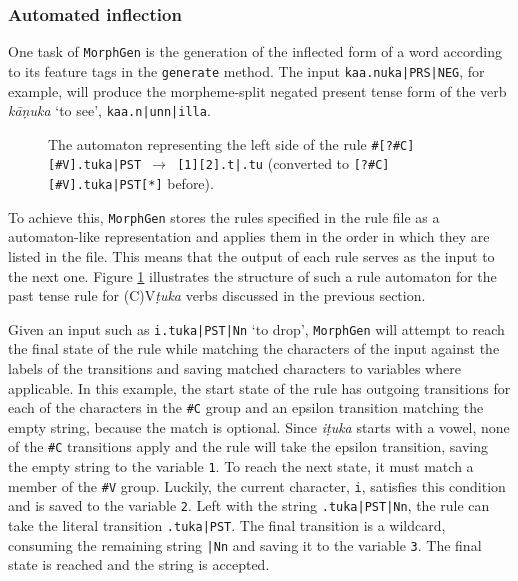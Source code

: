 \documentclass[a4paper]{article}
\newcommand{\arr}{$\rightarrow$ }
\newcommand{\typ}[1]{\texttt{#1}}
\begin{document}
\subsubsection{Automated inflection}

One task of \typ{MorphGen} is the generation of the inflected form of a word according to its feature tags in the \typ{generate} method. The input \typ{kaa.nuka|PRS|NEG}, for example, will produce the morpheme-split negated present tense form of the verb \textit{kāṇuka} `to see', \typ{kaa.n|unn|illa}.

\begin{figure}
\caption{The automaton representing the left side of the rule \typ{\#[?\#C][\#V].tuka|PST \arr [1][2].t|.tu} (converted to \typ{[?\#C][\#V].tuka|PST[*]} before).}
\label{morphrule}
\end{figure}

To achieve this, \typ{MorphGen} stores the rules specified in the rule file as a automaton-like representation and applies them in the order in which they are listed in the file. This means that the output of each rule serves as the input to the next one. Figure \ref{morphrule} illustrates the structure of such a rule automaton for the past tense rule for (C)V\textit{ṭuka} verbs discussed in the previous section.

Given an input such as \typ{i.tuka|PST|Nn} `to drop', \typ{MorphGen} will attempt to reach the final state of the rule while matching the characters of the input against the labels of the transitions and saving matched characters to variables where applicable. In this example, the start state of the rule has outgoing transitions for each of the characters in the \typ{\#C} group and an epsilon transition matching the empty string, because the match is optional. Since \textit{iṭuka} starts with a vowel, none of the \typ{\#C} transitions apply and the rule will take the epsilon transition, saving the empty string to the variable \typ{1}. To reach the next state, it must match a member of the \typ{\#V} group. Luckily, the current character, \typ{i}, satisfies this condition and is saved to the variable \typ{2}. Left with the string \typ{.tuka|PST|Nn}, the rule can take the literal transition \typ{.tuka|PST}. The final transition is a wildcard, consuming the remaining string \typ{|Nn} and saving it to the variable \typ{3}. The final state is reached and the string is accepted.
\end{document}
